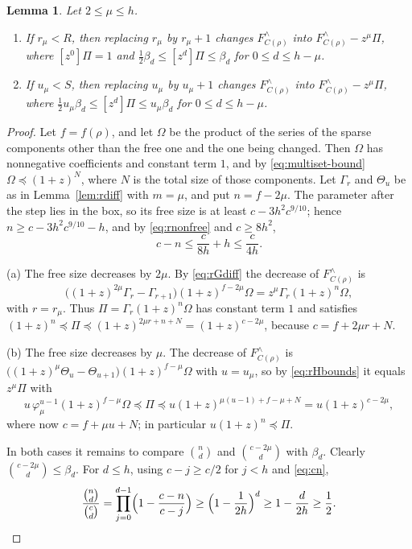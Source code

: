 \documentclass[11pt]{amsart}
\newtheorem{lemma}[theorem]{Lemma}
\theoremstyle{definition}
\theoremstyle{remark}
\numberwithin{equation}{section}
\newcommand{\Fr}{F^{\wedge}}
\newcommand{\coef}[1]{[z^{#1}]}
\newcommand{\cle}{\preceq}
\begin{document}
\begin{lemma}\label{lem:rsteps}
Let $2\le\mu\le h$.
\begin{enumerate}[label=\textup{(\alph*)}]
\item If $r_\mu<R$, then replacing $r_\mu$ by $r_\mu+1$ changes $\Fr_{C(\rho)}$ into $\Fr_{C(\rho)}-z^\mu\Pi$, where $\coef0\Pi=1$ and $\tfrac12\beta_d\le\coef d\Pi\le\beta_d$ for $0\le d\le h-\mu$.
\item If $u_\mu<S$, then replacing $u_\mu$ by $u_\mu+1$ changes $\Fr_{C(\rho)}$ into $\Fr_{C(\rho)}-z^\mu\Pi$, where $\tfrac12u_\mu\beta_d\le\coef d\Pi\le u_\mu\beta_d$ for $0\le d\le h-\mu$.
\end{enumerate}
\end{lemma}

\begin{proof}
Let $f=f(\rho)$, and let $\Omega$ be the product of the series of the sparse components other than the free one and the one being changed. Then $\Omega$ has nonnegative coefficients and constant term $1$, and by \eqref{eq:multiset-bound} $\Omega\cle(1+z)^{N}$, where $N$ is the total size of those components. Let $\Gamma_r$ and $\Theta_u$ be as in Lemma~\ref{lem:rdiff} with $m=\mu$, and put $n=f-2\mu$. The parameter after the step lies in the box, so its free size is at least $c-3h^2c^{9/10}$; hence $n\ge c-3h^2c^{9/10}-h$, and by \eqref{eq:rnonfree} and $c\ge 8h^2$,
\begin{equation}\label{eq:cn}
c-n\le\frac{c}{8h}+h\le\frac{c}{4h}.
\end{equation}

(a) The free size decreases by $2\mu$. By \eqref{eq:rGdiff} the decrease of $\Fr_{C(\rho)}$ is
\[
\bigl((1+z)^{2\mu}\Gamma_{r}-\Gamma_{r+1}\bigr)(1+z)^{f-2\mu}\Omega=z^\mu\Gamma_r(1+z)^{n}\Omega,
\]
with $r=r_\mu$. Thus $\Pi=\Gamma_r(1+z)^n\Omega$ has constant term $1$ and satisfies $(1+z)^n\cle\Pi\cle(1+z)^{2\mu r+n+N}=(1+z)^{c-2\mu}$, because $c=f+2\mu r+N$.

(b) The free size decreases by $\mu$. The decrease of $\Fr_{C(\rho)}$ is $\bigl((1+z)^\mu\Theta_u-\Theta_{u+1}\bigr)(1+z)^{f-\mu}\Omega$ with $u=u_\mu$, so by \eqref{eq:rHbounds} it equals $z^\mu\Pi$ with
\[
u\,\varphi_\mu^{u-1}(1+z)^{f-\mu}\Omega\cle\Pi\cle u(1+z)^{\mu(u-1)+f-\mu+N}=u(1+z)^{c-2\mu},
\]
where now $c=f+\mu u+N$; in particular $u(1+z)^n\cle\Pi$.

In both cases it remains to compare $\binom nd$ and $\binom{c-2\mu}{d}$ with $\beta_d$. Clearly $\binom{c-2\mu}d\le\beta_d$. For $d\le h$, using $c-j\ge c/2$ for $j<h$ and \eqref{eq:cn},
\[
\frac{\binom nd}{\binom cd}=\prod_{j=0}^{d-1}\Bigl(1-\frac{c-n}{c-j}\Bigr)\ge\Bigl(1-\frac1{2h}\Bigr)^d\ge 1-\frac d{2h}\ge\frac12.\qedhere
\]
\end{proof}
\end{document}
